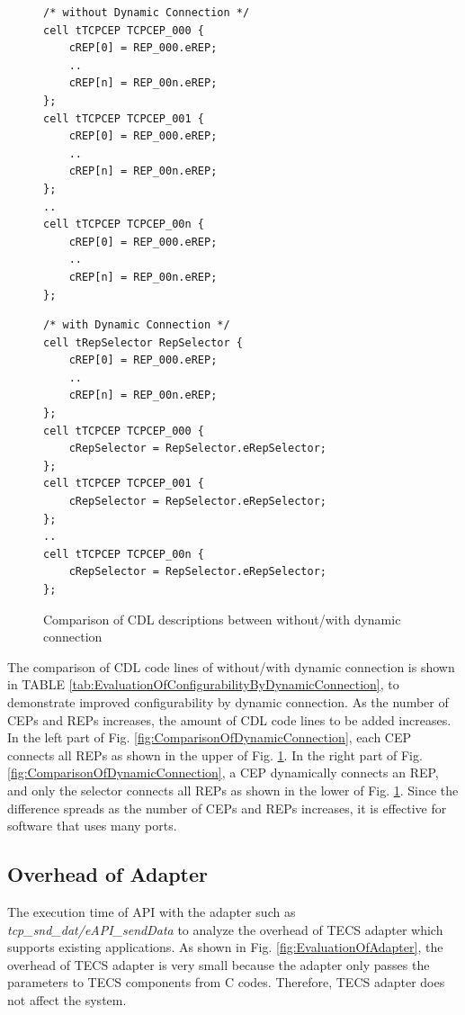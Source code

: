 \documentclass[conference]{IEEEtran/IEEEtran}
\begin{document}
\begin{figure}[t]
 \centering
 \begin{lstlisting}
/* without Dynamic Connection */
cell tTCPCEP TCPCEP_000 {
    cREP[0] = REP_000.eREP;
    ..
    cREP[n] = REP_00n.eREP;
};
cell tTCPCEP TCPCEP_001 {
    cREP[0] = REP_000.eREP;
    ..
    cREP[n] = REP_00n.eREP;
};
..
cell tTCPCEP TCPCEP_00n {
    cREP[0] = REP_000.eREP;
    ..
    cREP[n] = REP_00n.eREP;
};
 \end{lstlisting}
 \centering
 \begin{lstlisting}
/* with Dynamic Connection */
cell tRepSelector RepSelector {
    cREP[0] = REP_000.eREP;
    ..
    cREP[n] = REP_00n.eREP;
};
cell tTCPCEP TCPCEP_000 {
    cRepSelector = RepSelector.eRepSelector;
};
cell tTCPCEP TCPCEP_001 {
    cRepSelector = RepSelector.eRepSelector;
};
..
cell tTCPCEP TCPCEP_00n {
    cRepSelector = RepSelector.eRepSelector;
};
 \end{lstlisting}
 \caption{Comparison of CDL descriptions between without/with dynamic connection}
 \label{src:ComparisonOfCDL}
\end{figure}

The comparison of CDL code lines of without/with dynamic connection is shown in TABLE \ref{tab:EvaluationOfConfigurabilityByDynamicConnection}, to demonstrate improved configurability by dynamic connection.
As the number of CEPs and REPs increases, the amount of CDL code lines to be added increases.
In the left part of Fig. \ref{fig:ComparisonOfDynamicConnection}, each CEP connects all REPs as shown in the upper of Fig. \ref{src:ComparisonOfCDL}. 
In the right part of Fig. \ref{fig:ComparisonOfDynamicConnection}, a CEP dynamically connects an REP, and only the selector connects all REPs as shown in the lower of Fig. \ref{src:ComparisonOfCDL}. 
Since the difference spreads as the number of CEPs and REPs increases, it is effective for software that uses many ports.


\subsection{Overhead of Adapter}

The execution time of API with the adapter such as {\it tcp\_snd\_dat/eAPI\_sendData} to analyze the overhead of TECS adapter which supports existing applications.
As shown in Fig. \ref{fig:EvaluationOfAdapter}, the overhead of TECS adapter is very small because the adapter only passes the parameters to TECS components from C codes.
Therefore, TECS adapter does not affect the system.
\end{document}
